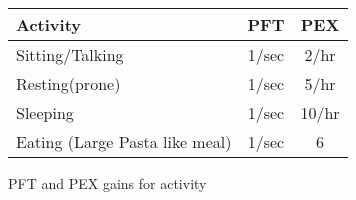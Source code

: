 \begin{SHTable}
	\begin{tabular}{lcc}
	Activity		&	PFT & PEX \\	
\hline
	Sitting/Talking	&	1/sec	& 2/hr \\
	Resting(prone)	&	1/sec	& 5/hr \\
	Sleeping		&	1/sec	& 10/hr \\
	Eating (Large Pasta like meal) 	 & 1/sec & 6 \\
    \end{tabular}
    \caption{PFT and PEX gains for activity}
\end{SHTable}
